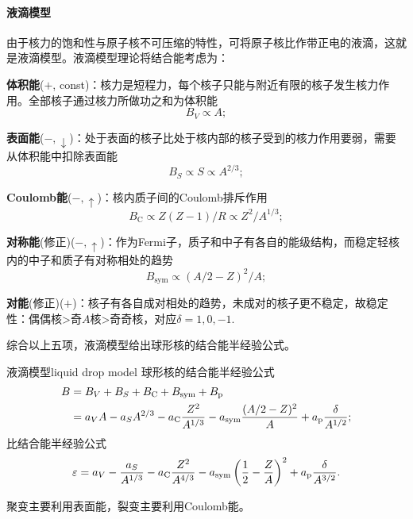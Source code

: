 \paragraph{液滴模型}
由于核力的饱和性与原子核不可压缩的特性，可将原子核比作带正电的液滴，这就是液滴模型。液滴模型理论将结合能考虑为：
\begin{compactenum}
	\item\textbf{体积能}($+$, const)：核力是短程力，每个核子只能与附近有限的核子发生核力作用。全部核子通过核力所做功之和为体积能
	\[
		B_V\propto A;
	\]
	\item\textbf{表面能}($-,\downarrow$)：处于表面的核子比处于核内部的核子受到的核力作用要弱，需要从体积能中扣除表面能
	\[
		B_S\propto S\propto A^{2/3};
	\]
	\item\textbf{Coulomb能}($-,\uparrow$)：核内质子间的Coulomb排斥作用
	\[
		B_\mathrm C\propto Z(Z-1)/R\propto Z^2/A^{1/3};
	\]
	\item\textbf{对称能}(修正)($-,\uparrow$)：作为Fermi子，质子和中子有各自的能级结构，而稳定轻核内的中子和质子有对称相处的趋势
	\[
		B_\mathrm{sym}\propto(A/2-Z)^2/A;
	\]
	\item\textbf{对能}(修正)($+$)：核子有各自成对相处的趋势，未成对的核子更不稳定，故稳定性：偶偶核>奇$A$核>奇奇核，对应$\delta=1,0,-1.$
\end{compactenum}
综合以上五项，液滴模型给出球形核的结合能半经验公式。
\begin{theorem}{液滴模型}{liquid drop model}
	球形核的结合能半经验公式
	\begin{align}\notag
		B&=B_V+B_S+B_\mathrm C+B_\mathrm{sym}+B_\mathrm p\\\label{liquid-drop model BE}
		&=a_VA-a_SA^{2/3}-a_\mathrm C\frac{Z^2}{A^{1/3}}-a_\mathrm{sym}\frac{(A/2-Z)^2}{A}+a_\mathrm p\frac{\delta}{A^{1/2}};
	\end{align}
	比结合能半经验公式
	\begin{align}\label{liquid-drop model SBE}
		\varepsilon=a_V-\frac{a_S}{A^{1/3}}-a_\mathrm C\frac{Z^2}{A^{4/3}}-a_\mathrm{sym}\left(\frac12-\frac ZA\right)^2+a_\mathrm p\frac{\delta}{A^{3/2}}.
	\end{align}
\end{theorem}
聚变主要利用表面能，裂变主要利用Coulomb能。

